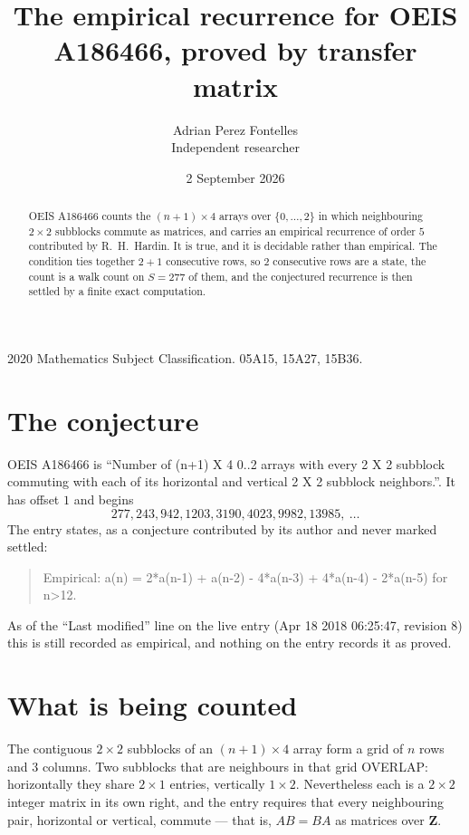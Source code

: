 \documentclass[11pt,a4paper]{article}
\title{The empirical recurrence for OEIS A186466, proved by transfer matrix}
\author{Adrian Perez Fontelles\\ \small Independent researcher}
\date{2 September 2026}
\theoremstyle{plain}
\theoremstyle{definition}
\begin{document}
\maketitle

\begin{abstract}
OEIS A186466 counts the $(n+1)\times4$ arrays over $\{0,\dots,2\}$ in which
neighbouring $2\times2$ subblocks commute as matrices, and carries an empirical recurrence
of order $5$ contributed by R.~H.~Hardin. It is true, and it is decidable rather than
empirical. The condition ties together $2+1$ consecutive rows, so $2$ consecutive rows are
a state, the count is a walk count on $S=277$ of them, and the conjectured recurrence is then
settled by a finite exact computation.
\end{abstract}

\noindent\small 2020 Mathematics Subject Classification. 05A15, 15A27, 15B36.\normalsize

\section{The conjecture}

OEIS A186466 is ``Number of (n+1) X 4 0..2 arrays with every 2 X 2 subblock commuting with each of its horizontal and vertical 2 X 2 subblock neighbors.''. It has offset $1$ and begins
\[
277, 243, 942, 1203, 3190, 4023, 9982, 13985,\ \dots
\]
The entry states, as a conjecture contributed by its author and never marked settled:
\begin{quote}
Empirical: a(n) = 2*a(n-1) + a(n-2) - 4*a(n-3) + 4*a(n-4) - 2*a(n-5) for n>12.
\end{quote}
As of the ``Last modified'' line on the live entry (Apr 18 2018 06:25:47, revision 8) this is still
recorded as empirical, and nothing on the entry records it as proved.

\section{What is being counted}

The contiguous $2\times2$ subblocks of an $(n+1)\times4$ array form a grid of $n$
rows and $3$ columns. Two subblocks that are neighbours in that
grid OVERLAP: horizontally they share $2\times1$ entries, vertically
$1\times2$. Nevertheless each is a $2\times2$ integer matrix in its own right, and
the entry requires that every neighbouring pair, horizontal or vertical, commute --- that is,
$AB=BA$ as matrices over $\mathbf{Z}$.
\end{document}
